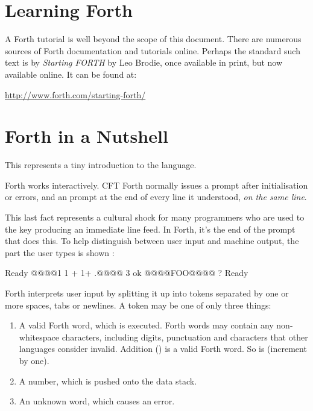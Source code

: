 \section{Learning Forth}

A Forth tutorial is well beyond the scope of this document. There are numerous
sources of Forth documentation and tutorials online. Perhaps the standard such
text is by {\em Starting FORTH\/} by Leo Brodie, once available in print, but
now available online. It can be found at:

\begin{center}
  \url{http://www.forth.com/starting-forth/}
\end{center}

\section{Forth in a Nutshell}

This represents a tiny introduction to the language.

Forth works interactively. CFT Forth normally issues a  prompt
after initialisation or errors, and an  prompt at the end of every
line it understood, {\em on the same line}.

This last fact represents a cultural shock for many programmers who are used to
the  key producing an immediate line feed. In Forth, it's the end
of the  prompt that does this. To help distinguish between user
input and machine output, the part the user types is shown
:

\begin{intrcode}
Ready
@@@@1 1 + 1+ .@@@@ 3 ok
@@@@FOO@@@@  ? Ready
\end{intrcode}

\noindent Forth interprets user input by splitting it up into tokens separated
by one or more spaces, tabs or newlines. A token may be one of only
three things:

\begin{enumerate}
\item A valid Forth word, which is executed. Forth words may contain
  any non-whitespace characters, including digits, punctuation and
  characters that other languages consider invalid. Addition (\fw{+})
  is a valid Forth word. So is  (increment by one).
\item A number, which is pushed onto the \gls{data stack}.
\item An unknown word, which causes an error.
\end{enumerate}

